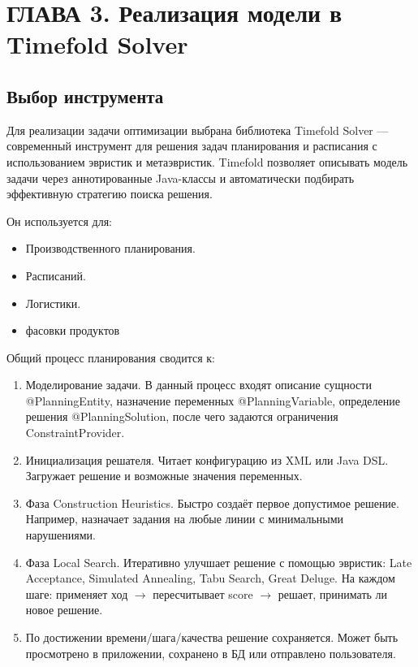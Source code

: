 \chapter{ ГЛАВА 3. Реализация модели в Timefold Solver}
\label{ch:chapter3}

\section{ Выбор инструмента}

Для реализации задачи оптимизации выбрана библиотека Timefold Solver — современный инструмент для решения задач планирования и расписания с использованием эвристик и метаэвристик. Timefold позволяет описывать модель задачи через аннотированные Java-классы и автоматически подбирать эффективную стратегию поиска решения.

Он используется для:
\begin{itemize}
    \item Производственного планирования.
    \item Расписаний.
    \item Логистики.
    \item фасовки продуктов
\end{itemize}

Общий процесс планирования сводится к:
\begin{enumerate}
    \item Моделирование задачи. В данный процесс входят описание сущности @PlanningEntity, назначение переменных @PlanningVariable, определение решения @PlanningSolution, после чего задаются ограничения ConstraintProvider.
    \item Инициализация решателя. Читает конфигурацию из XML или Java DSL. Загружает решение и возможные значения переменных.
    \item Фаза Construction Heuristics. Быстро создаёт первое допустимое решение. Например, назначает задания на любые линии с минимальными нарушениями.
    \item Фаза Local Search. Итеративно улучшает решение с помощью эвристик: Late Acceptance, Simulated Annealing, Tabu Search, Great Deluge. На каждом шаге: применяет ход $\rightarrow$ пересчитывает score $\rightarrow$ решает, принимать ли новое решение.
    \item По достижении времени/шага/качества решение сохраняется. Может быть просмотрено в приложении, сохранено в БД или отправлено пользователя.
\end{enumerate}

